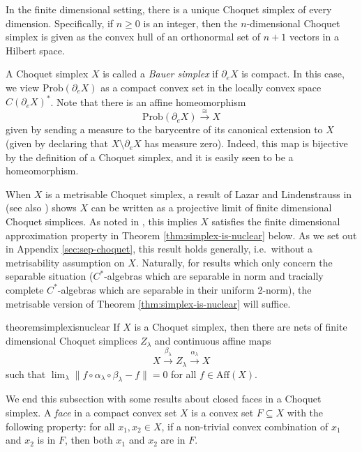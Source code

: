 \documentclass[a4paper,11pt]{amsart}
\theoremstyle{definition}
\numberwithin{equation}{section}
\numberwithin{theorem}{section}
\begin{document}
In the finite dimensional setting, there is a unique Choquet simplex of every dimension.  Specifically, if $n \geq 0$ is an integer, then the $n$-dimensional Choquet simplex is given as the convex hull of an orthonormal set of $n + 1$ vectors in a Hilbert space.  

A Choquet simplex $X$ is called a \emph{Bauer simplex} if $\partial_e X$ is compact.  In this case, we view $\mathrm{Prob}(\partial_e X)$ as a compact convex set in the locally convex space $C(\partial_e X)^*$.  Note that there is an affine homeomorphism
\begin{equation}
	\mathrm{Prob}(\partial_e X) \overset\cong\longrightarrow X
\end{equation}
given by sending a measure to the barycentre of its canonical extension to $X$ (given by declaring that $X \setminus \partial_e X$ has measure zero).  Indeed, this map is bijective by the definition of a Choquet simplex, and it is easily seen to be a homeomorphism.

When $X$ is a metrisable Choquet simplex, a result of Lazar and Lind\-enstrauss in \cite[Corollary of Theorem~5.2]{Lazar-Lindenstrauss71} (see also \cite[Theorem~11.6]{Go86}) shows $X$ can be written as a projective limit of finite dimensional Choquet simplices.  As noted in \cite[Lemma~2.8]{Elliott-Niu15}, this implies $X$ satisfies the finite dimensional approximation property in Theorem \ref{thm:simplex-is-nuclear} below.  As we set out in Appendix \ref{sec:sep-choquet}, this result holds generally, i.e.\ without a metrisability assumption on $X$. Naturally, for results which only concern the separable situation ($C^*$-algebras which are separable in norm and tracially complete $C^*$-algebras which are separable in their uniform 2-norm), the metrisable version of Theorem \ref{thm:simplex-is-nuclear} will suffice.

\begin{restatable}{theorem}{simplexisnuclear}
	\label{thm:simplex-is-nuclear}
	If $X$ is a Choquet simplex, then there are nets of finite dimensional Choquet simplices $Z_\lambda$ and continuous affine maps
	\begin{equation}
		X \overset{\beta_\lambda}{\longrightarrow} Z_\lambda \overset{\alpha_\lambda}{\longrightarrow} X
	\end{equation}
	such that $\lim_\lambda \|f \circ \alpha_\lambda \circ \beta_\lambda - f \| = 0$ for all $f \in \mathrm{Aff}(X)$.
\end{restatable}

We end this subsection with some results about closed faces in a Choquet simplex.  A \emph{face} in a compact convex set $X$ is a convex set $F \subseteq X$ with the following property: 
for all $x_1, x_2 \in X$, if a non-trivial convex combination of $x_1$ and $x_2$ is in $F$, then both $x_1 $ and $x_2$ are in $F$.
\end{document}
